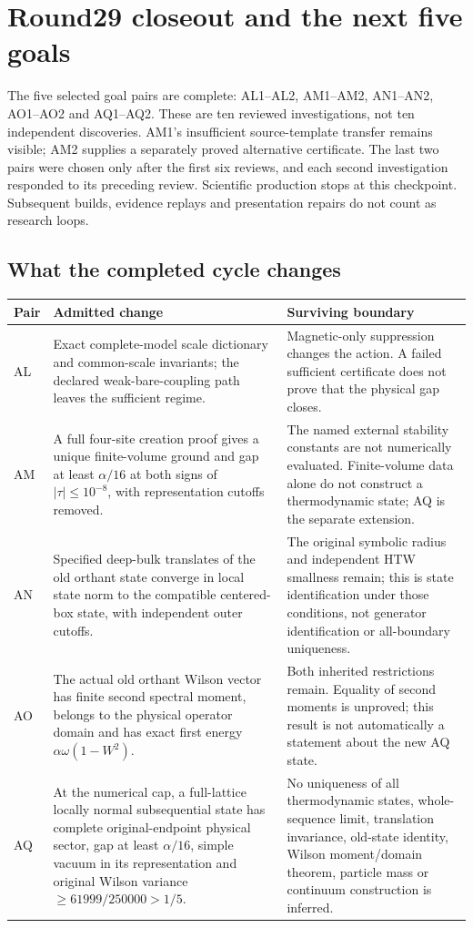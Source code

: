 \section{Round29 closeout and the next five goals}
\label{sec:round29-closeout}
The five selected goal pairs are complete: AL1--AL2, AM1--AM2, AN1--AN2, AO1--AO2 and AQ1--AQ2. These are ten reviewed investigations, not ten independent discoveries. AM1's insufficient source-template transfer remains visible; AM2 supplies a separately proved alternative certificate. The last two pairs were chosen only after the first six reviews, and each second investigation responded to its preceding review. Scientific production stops at this checkpoint. Subsequent builds, evidence replays and presentation repairs do not count as research loops.

\subsection{What the completed cycle changes}
\begin{longtable}{@{}p{17mm}p{69mm}p{64mm}@{}}
\toprule Pair & Admitted change & Surviving boundary\\\midrule\endhead
AL & Exact complete-model scale dictionary and common-scale invariants; the declared weak-bare-coupling path leaves the sufficient regime. & Magnetic-only suppression changes the action. A failed sufficient certificate does not prove that the physical gap closes.\\\addlinespace
AM & A full four-site creation proof gives a unique finite-volume ground and gap at least $\alpha/16$ at both signs of $|\tau|\le10^{-8}$, with representation cutoffs removed. & The named external stability constants are not numerically evaluated. Finite-volume data alone do not construct a thermodynamic state; AQ is the separate extension.\\\addlinespace
AN & Specified deep-bulk translates of the old orthant state converge in local state norm to the compatible centered-box state, with independent outer cutoffs. & The original symbolic radius and independent HTW smallness remain; this is state identification under those conditions, not generator identification or all-boundary uniqueness.\\\addlinespace
AO & The actual old orthant Wilson vector has finite second spectral moment, belongs to the physical operator domain and has exact first energy $\alpha\omega(1-W^2)$. & Both inherited restrictions remain. Equality of second moments is unproved; this result is not automatically a statement about the new AQ state.\\\addlinespace
AQ & At the numerical cap, a full-lattice locally normal subsequential state has complete original-endpoint physical sector, gap at least $\alpha/16$, simple vacuum in its representation and original Wilson variance $\ge61999/250000>1/5$. & No uniqueness of all thermodynamic states, whole-sequence limit, translation invariance, old-state identity, Wilson moment/domain theorem, particle mass or continuum construction is inferred.\\\bottomrule
\end{longtable}

